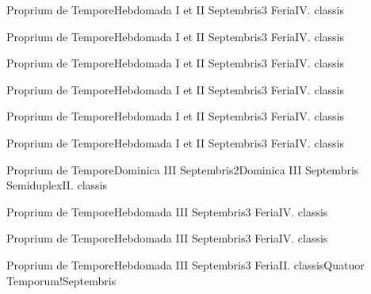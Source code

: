 \documentclass[liber-responsorialis_aestivus.tex]{subfiles}
\begin{document}
	{Proprium de Tempore}{Hebdomada I et II Septembris}{3}{}
	{Feria}{IV. classis}{}
	{}
	{}

	{Proprium de Tempore}{Hebdomada I et II Septembris}{3}{}
	{Feria}{IV. classis}{}
	{}
	{}

	{Proprium de Tempore}{Hebdomada I et II Septembris}{3}{}
	{Feria}{IV. classis}{}
	{}
	{}

	{Proprium de Tempore}{Hebdomada I et II Septembris}{3}{}
	{Feria}{IV. classis}{}
	{}
	{}

	{Proprium de Tempore}{Hebdomada I et II Septembris}{3}{}
	{Feria}{IV. classis}{}
	{}
	{}

	{Proprium de Tempore}{Hebdomada I et II Septembris}{3}{}
	{Feria}{IV. classis}{}
	{}
	{}

\newpage

	{Proprium de Tempore}{Dominica III Septembris}{2}{Dominica III Septembris}
	{Semiduplex}{II. classis}{}
	{}
	{}

	{Proprium de Tempore}{Hebdomada III Septembris}{3}{}
	{Feria}{IV. classis}{}
	{}
	{}


	{Proprium de Tempore}{Hebdomada III Septembris}{3}{}
	{Feria}{IV. classis}{}
	{}
	{}

	{Proprium de Tempore}{Hebdomada III Septembris}{3}{}
	{Feria}{II. classis}{Quatuor Temporum!Septembris}
	{}
	{}
\end{document}
